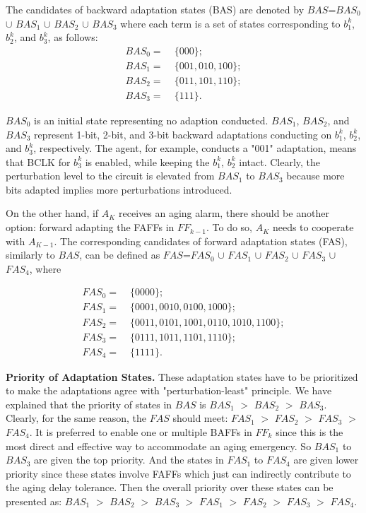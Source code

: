 The candidates of backward adaptation states (BAS) are denoted by $BAS$=$BAS_0$ $\cup$ $BAS_1$ $\cup$ $BAS_2$ $\cup$ $BAS_3$ where each term is a set of states corresponding to $b_1^k$, $b_2^k$, and $b_3^k$, as follows: 
{\small\begin{align}
BAS_0=\;&\{000\};            \nonumber \\
BAS_1=\;&\{001, 010, 100\};    \nonumber\\
BAS_2=\;&\{011, 101, 110\};  \nonumber \\
BAS_3=\;&\{111\}          . \nonumber
\end{align}}

$BAS_0$ is an initial state representing no adaption conducted. $BAS_1$, $BAS_2$, and $BAS_3$ represent 1-bit, 2-bit, and 3-bit backward adaptations conducting on $b_1^k$, $b_2^k$, and $b_3^k$, respectively. The agent, for example, conducts a "001" adaptation, means that BCLK for $b_3^k$ is enabled, while keeping the $b_1^k$, $b_2^k$ intact. Clearly, the perturbation level to the circuit is elevated from $BAS_1$ to $BAS_3$ because more bits adapted implies more perturbations introduced.

On the other hand, if $A_K$ receives an aging alarm, there should be another option: forward adapting the FAFFs in $FF_{k-1}$. To do so, $A_K$ needs to cooperate with $A_{K-1}$. The corresponding candidates of forward adaptation states (FAS), similarly to $BAS$, can be defined as $FAS$=$FAS_0$ $\cup$ $FAS_1$ $\cup$ $FAS_2$ $\cup$ $FAS_3$ $\cup$ $FAS_4$, where

{\small\begin{align}
FAS_0=\;&\{0000\}; \nonumber \\
FAS_1=\;&\{0001, 0010, 0100, 1000\}; \nonumber \\
FAS_2=\;&\{0011, 0101, 1001, 0110, 1010, 1100\}; \nonumber \\
FAS_3=\;&\{0111, 1011, 1101, 1110 \}; \nonumber \\
FAS_4=\;&\{1111\}. \nonumber
\end{align}}

{\bf Priority of Adaptation States.} These adaptation states have to be prioritized to make the adaptations agree with "perturbation-least" principle. We have explained that the priority of states in $BAS$ is $BAS_1$ $>$ $BAS_2$ $>$ $BAS_3$. Clearly, for the same reason, the $FAS$ should meet: $FAS_1$ $>$ $FAS_2$ $>$ $FAS_3$ $>$ $FAS_4$. It is preferred to enable one or multiple BAFFs in $FF_k$ since this is the most direct and effective way to accommodate an aging emergency. So $BAS_1$ to $BAS_3$ are given the top priority. And the states in $FAS_1$ to $FAS_4$ are given lower priority since these states involve FAFFs which just can indirectly contribute to the aging delay tolerance. Then the overall priority over these states can be presented as: $BAS_1$ $>$ $BAS_2$ $>$ $BAS_3$ $>$ $FAS_1$ $>$ $FAS_2$ $>$ $FAS_3$ $>$ $FAS_4$.

